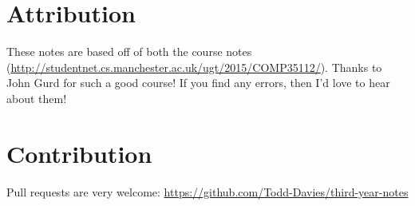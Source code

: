 \section*{Attribution}

These notes are based off of both the course notes
(\url{http://studentnet.cs.manchester.ac.uk/ugt/2015/COMP35112/}). Thanks to John Gurd for such a good course! If you find any errors, then I'd love to hear about them!

\section*{Contribution}

Pull requests are very welcome:
\url{https://github.com/Todd-Davies/third-year-notes}